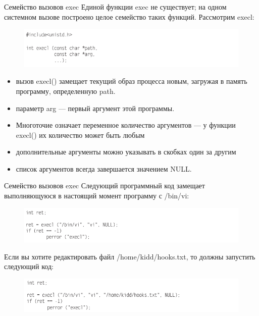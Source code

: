 \documentclass{beamer}
\begin{document}
\begin{frame}{Семейство вызовов exec}
Единой функции exec не существует; на одном системном вызове построено целое
семейство таких функций. Рассмотрим execl:
\begin{figure}[h]
\centering
\includegraphics[scale=0.5]{images/lec07-pic04.png}
\end{figure}
\begin{itemize}
\item вызов execl() замещает текущий образ процесса новым, загружая в память
программу, определенную path. 
\item параметр arg — первый аргумент этой программы. 
\item Многоточие означает переменное количество аргументов — у функции
execl() их количество может быть любым
\item дополнительные аргументы можно указывать в скобках один за другим
\item список аргументов всегда завершается значением NULL.
\end{itemize}
\end{frame}

\begin{frame}{Семейство вызовов exec}
Следующий программный код замещает выполняющуюся в настоящий момент программу с /bin/vi:
\begin{figure}[h]
\centering
\includegraphics[scale=0.5]{images/lec07-pic05.png}
\end{figure}
Если вы хотите редактировать файл /home/kidd/hooks.txt, то должны запустить следующий код:
\begin{figure}[h]
\centering
\includegraphics[scale=0.5]{images/lec07-pic06.png}
\end{figure}
\end{frame}
\end{document}
